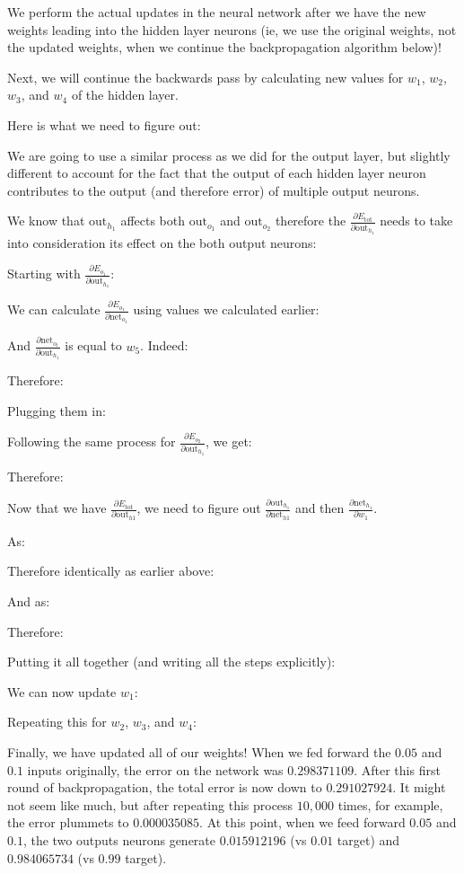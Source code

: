 \begin{enumerate}
		We perform the actual updates in the neural network after we have the new weights leading into the hidden layer neurons (ie, we use the original weights, not the updated weights, when we continue the backpropagation algorithm below)!
		
		Next, we will continue the backwards pass by calculating new values for $w_1$, $w_2$, $w_3$, and $w_4$ of the hidden layer.

		Here is what we need to figure out:
		
		We are going to use a similar process as we did for the output layer, but slightly different to account for the fact that the output of each hidden layer neuron contributes to the output (and therefore error) of multiple output neurons.
		
		We know that $\text{out}_{h_1}$ affects both $\text{out}_{o_1}$ and $\text{out}_{o_2}$ therefore the $\frac{\partial E_{\text{tot}}}{\partial \text{out}_{h_1}}$ needs to take into consideration its effect on the both output neurons:
		
		Starting with $\frac{\partial E_{o_1}}{\partial \text{out}_{h_1}}$:
		
		We can calculate $\frac{\partial E_{o_1}}{\partial \text{net}_{o_1}}$ using values we calculated earlier:
		
		And $\frac{\partial \text{net}_{o_1}}{\partial \text{out}_{h_1}}$ is equal to $w_5$. Indeed:
		
		Therefore:
		
		Plugging them in:
		
		Following the same process for $\frac{\partial E_{o_2}}{\partial \text{out}_{h_1}}$, we get:
		
		Therefore:
		
		Now that we have $\frac{\partial E_{\text{tot}}}{\partial \text{out}_{h1}}$, we need to figure out $\frac{\partial \text{out}_{h_1}}{\partial \text{net}_{h1}}$ and then $\frac{\partial \text{net}_{h_1}}{\partial w_1}$.

		As:
		
		Therefore identically as earlier above:
		
		And as:
		
		Therefore:
		
		Putting it all together (and writing all the steps explicitly):
		
		We can now update $w_1$:
		
		Repeating this for $w_2$, $w_3$, and $w_4$:
		
	\end{enumerate}
	Finally, we have updated all of our weights! When we fed forward the $0.05$ and $0.1$ inputs originally, the error on the network was $0.298371109$. After this first round of backpropagation, the total error is now down to $0.291027924$. It might not seem like much, but after repeating this process $10,000$ times, for example, the error plummets to $0.000035085$. At this point, when we feed forward $0.05$ and $0.1$, the two outputs neurons generate $0.015912196$ (vs $0.01$ target) and $0.984065734$ (vs $0.99$ target).
	
